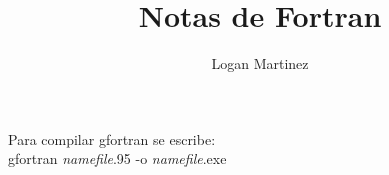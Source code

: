 \documentclass[]{article}
\title{Notas de Fortran}
\author{Logan Martinez}
\begin{document}
	
	\maketitle
	
	\section{}
	
		Para compilar gfortran se escribe:\\
		
		gfortran \textit{namefile}.95 -o \textit{namefile}.exe
\end{document}
